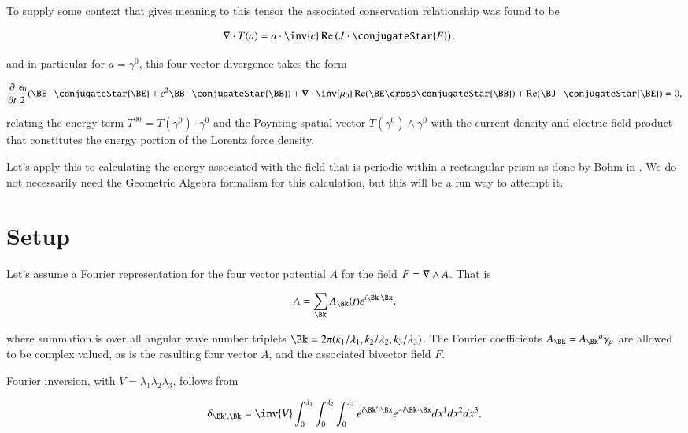 To supply some context that gives meaning to this tensor the associated conservation relationship was found to be

\begin{align}\label{eqn:fourierMaxVac:3}
\grad \cdot T(a) &= a \cdot \inv{ c } \Real \left( J \cdot \conjugateStar{F} \right).
\end{align}

and in particular for $a = \gamma^0$, this four vector divergence takes the form

\begin{align}\label{eqn:fourierMaxVac:4}
\PD{t}{}\frac{\epsilon_0}{2}(\BE \cdot \conjugateStar{\BE} + c^2 \BB \cdot \conjugateStar{\BB})
+ \spacegrad \cdot \inv{\mu_0} \Real (\BE \cross \conjugateStar{\BB} )
+ \Real( \BJ \cdot \conjugateStar{\BE} ) 
= 0,
\end{align}

relating the energy term $T^{00} = T(\gamma^0) \cdot \gamma^0$ and the Poynting spatial vector $T(\gamma^0) \wedge \gamma^0$ with the current density and electric field product that constitutes the energy portion of the Lorentz force density.

Let's apply this to calculating the energy associated with the field that is periodic within a rectangular prism as done by Bohm in \cite{bohm1989qt}.  We do not necessarily need the Geometric Algebra formalism for this calculation, but this will be a fun way to attempt it.

\section{Setup}

Let's assume a Fourier representation for the four vector potential $A$ for the field $F = \nabla \wedge A$.  That is

\begin{align}
\label{eqn:fourierMaxVac:5}
A = \sum_{\Bk} A_\Bk(t) e^{i \Bk \cdot \Bx},
\end{align}

where summation is over all angular wave number triplets $\Bk = 2 \pi (k_1/\lambda_1, k_2/\lambda_2, k_3/\lambda_3)$.  The Fourier coefficients $A_\Bk = {A_\Bk}^\mu \gamma_\mu$ are allowed to be complex valued, as is the resulting four vector $A$, and the associated bivector field $F$.

Fourier inversion, with $V = \lambda_1 \lambda_2 \lambda_3$, follows from

\begin{align}\label{eqn:fourierMaxVac:6}
\delta_{\Bk', \Bk} =
\inv{ V }
\int_0^{\lambda_1}
\int_0^{\lambda_2}
\int_0^{\lambda_3} 
e^{ i \Bk' \cdot \Bx} 
e^{-i \Bk \cdot \Bx} dx^1 dx^2 dx^3,
\end{align}

